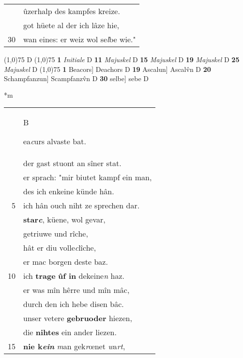 \documentclass[8pt,a4paper,notitlepage]{article}
\begin{document}
\begin{table}[ht]
\begin{minipage}[t]{0.5\linewidth}
\begin{tabular}{rl}
 & ûzerhalp des kampfes kreize.\\ 
 & got hüete al der ich lâze hie,\\ 
30 & wan eines: er weiz wol se\textit{l}be wie."\\ 
\end{tabular}
\scriptsize
\line(1,0){75} \newline
D \newline
\line(1,0){75} \newline
\textbf{1} \textit{Initiale} D  \textbf{11} \textit{Majuskel} D  \textbf{15} \textit{Majuskel} D  \textbf{19} \textit{Majuskel} D  \textbf{25} \textit{Majuskel} D  \newline
\line(1,0){75} \newline
\textbf{1} Beacors] Deachors D \textbf{19} Ascalun] Ascalv̂n D \textbf{20} Schampfanzun] Scampfanzv̂n D \textbf{30} selbe] sebe D \newline
\end{minipage}
\hspace{0.5cm}
\begin{minipage}[t]{0.5\linewidth}
\small
\begin{center}*m
\end{center}
\begin{tabular}{rl}
 & \begin{large}B\end{large}ea\textit{c}urs alvaste bat.\\ 
 & der gast stuont an sîner stat.\\ 
 & er sprach: "mir biutet kampf ein man,\\ 
 & des ich enkeine künde hân.\\ 
5 & ich hân ouch niht ze sprechen dar.\\ 
 & \textbf{star\textit{c}}, küene, wol gevar,\\ 
 & getriuwe und rîche,\\ 
 & hât er diu volle\textit{c}lîche,\\ 
 & er mac borgen deste baz.\\ 
10 & ich \textbf{trage} \textbf{ûf in} dekeine\textit{n} haz.\\ 
 & er was mîn hêrre und mîn mâc,\\ 
 & durch den ich hebe disen bâc.\\ 
 & unser vetere \textbf{gebruoder} hiezen,\\ 
 & die \textbf{nihtes} ein ander liezen.\\ 
15 & \textbf{nie k\textit{ein}} \textit{m}an gek\textit{r}œnet \textit{w}a\textit{rt},\\ 

\end{tabular}
\end{minipage}
\end{table}
\end{document}
